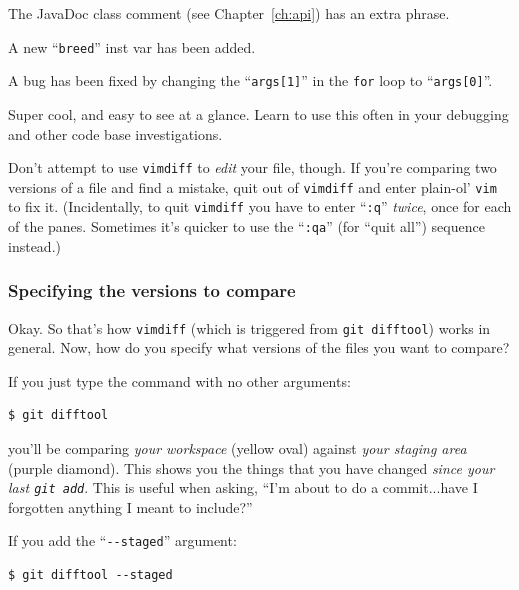 \begin{compactenum}
\item The JavaDoc class comment (see Chapter~\ref{ch:api}) has an extra phrase.
\item A new ``\texttt{breed}'' inst var has been added.
\item A bug has been fixed by changing the ``\texttt{args[1]}'' in the
\texttt{for} loop to ``\texttt{args[0]}''.
\end{compactenum}

Super cool, and easy to see at a glance. Learn to use this often in your
debugging and other code base investigations.

Don't attempt to use \texttt{vimdiff} to \textit{edit} your file, though. If
you're comparing two versions of a file and find a mistake, quit out of
\texttt{vimdiff} and enter plain-ol' \texttt{vim} to fix it. (Incidentally, to
quit \texttt{vimdiff} you have to enter ``\texttt{:q}'' \textit{twice}, once
for each of the panes. Sometimes it's quicker to use the ``\texttt{:qa}'' (for
``quit all'') sequence instead.)

\subsubsection{Specifying the versions to compare}

Okay. So that's how \texttt{vimdiff} (which is triggered from \texttt{git
difftool}) works in general. Now, how do you specify what versions of the
files you want to compare?

If you just type the command with no other arguments:

\begin{Verbatim}[fontsize=\small,samepage=true,frame=none]
$ git difftool
\end{Verbatim}

you'll be comparing \textit{your workspace} (yellow oval) against \textit{your
staging area} (purple diamond). This shows you the things that you have
changed \textit{since your last \texttt{git add}}. This is useful when asking,
``I'm about to do a commit...have I forgotten anything I meant to include?''

If you add the ``\texttt{-{}-staged}'' argument:

\begin{Verbatim}[fontsize=\small,samepage=true,frame=none]
$ git difftool --staged
\end{Verbatim}

